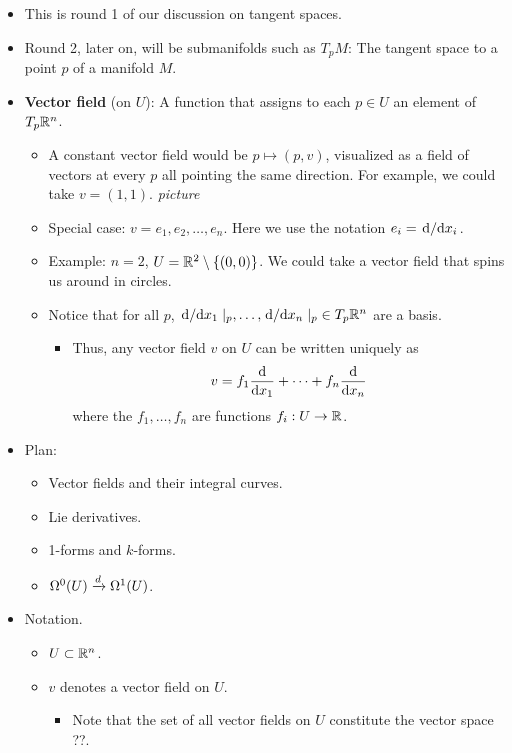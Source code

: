 \documentclass[../notes.tex]{subfiles}
\begin{document}
\begin{itemize}
    \item This is round 1 of our discussion on tangent spaces.
    \item Round 2, later on, will be submanifolds such as $T_pM$: The tangent space to a point $p$ of a manifold $M$.
    \item \textbf{Vector field} (on $U$): A function that assigns to each $p\in U$ an element of $T_p\R^n$.
    \begin{itemize}
        \item A constant vector field would be $p\mapsto(p,v)$, visualized as a field of vectors at every $p$ all pointing the same direction. For example, we could take $v=(1,1)$.
        \emph{picture}
        \item Special case: $v=e_1,e_2,\dots,e_n$. Here we use the notation $e_i=\dv*{x_i}$.
        \item Example: $n=2$, $U=\R^2\setminus\{(0,0)\}$. We could take a vector field that spins us around in circles.
        \item Notice that for all $p$, $\dv*{x_1}|_p,\dots,\dv*{x_n}|_p\in T_p\R^n$ are a basis.
        \begin{itemize}
            \item Thus, any vector field $v$ on $U$ can be written uniquely as
            \begin{equation*}
                v = f_1\dv{x_1}+\cdots+f_n\dv{x_n}
            \end{equation*}
            where the $f_1,\dots,f_n$ are functions $f_i:U\to\R$.
        \end{itemize}
    \end{itemize}
    \item {}Plan:
    \begin{itemize}
        \item Vector fields and their integral curves.
        \item Lie derivatives.
        \item 1-forms and $k$-forms.
        \item $\ome[0]{U}\xrightarrow{d}\ome[1]{U}$.
    \end{itemize}
    \item Notation.
    \begin{itemize}
        \item $U\subset\R^n$.
        \item $v$ denotes a vector field on $U$.
        \begin{itemize}
            \item Note that the set of all vector fields on $U$ constitute the vector space ??.

\end{itemize}
\end{itemize}
\end{itemize}
\end{document}
